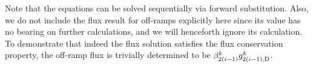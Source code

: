 Note that the equations can be solved sequentially via forward substitution. Also, we do not include
the flux result for off-ramps explicitly here since its value has no
bearing on further calculations, and we will henceforth ignore its
calculation. To demonstrate that indeed the flux solution satisfies
the flux conservation property, the off-ramp flux is trivially determined
to be $\splitratio_{2\left(\link-1\right)}^{\tind}\fout{2\left(\link-1\right)}{\tind}$.
